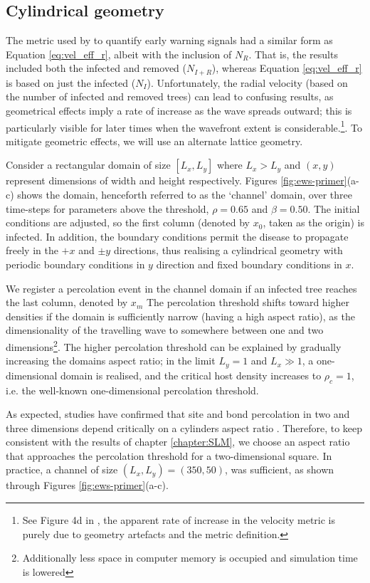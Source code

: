 \subsection{Cylindrical geometry}

The metric used by \cite{OROZCOFUENTES201912} to quantify early warning signals had a similar form as Equation \ref{eq:vel_eff_r}, albeit with the inclusion of $N_R$.
That is, the results included both the infected and removed ($N_{I+R}$), whereas Equation \ref{eq:vel_eff_r} is based on just the infected ($N_I$). 
Unfortunately, the radial velocity (based on the number of infected and removed trees) can lead to confusing results, as geometrical effects imply a rate of increase as the wave spreads outward; this is particularly visible for later times when the wavefront extent is considerable.\footnote{See Figure 4d in \cite{OROZCOFUENTES201912}, the apparent rate of increase in the velocity metric is purely due to geometry artefacts and the metric definition.}.
To mitigate geometric effects, we will use an alternate lattice geometry.

Consider a rectangular domain of size $[L_x, L_y]$ where $L_x>L_y$ and $(x, y)$ represent dimensions of width and height respectively.
Figures \ref{fig:ews-primer}(a-c) shows the domain, henceforth referred to as the `channel' domain, over three time-steps for parameters above the threshold, $\rho=0.65$ and $\beta=0.50$.
The initial conditions are adjusted, so the first column (denoted by $x_0$, taken as the origin) is infected.
In addition, the boundary conditions permit the disease to propagate freely in the $+x$ and $\pm y$ directions, thus realising a cylindrical geometry with periodic boundary conditions in $y$ direction and fixed boundary conditions in $x$.

We register a percolation event in the channel domain if an infected tree reaches the last column, denoted by $x_m$
The percolation threshold shifts toward higher densities if the domain is sufficiently narrow (having a high aspect ratio), as the dimensionality of the travelling wave to somewhere between one and two dimensions\footnote{Additionally less space in computer memory is occupied and simulation time is lowered}. 
The higher percolation threshold can be explained by gradually increasing the domains aspect ratio;
in the limit $L_y = 1$ and $L_x  \gg 1$, a one-dimensional domain is realised, and the critical host density increases to $\rho_c=1$, i.e. the well-known one-dimensional percolation threshold.

As expected, studies have confirmed that site and bond percolation in two and three dimensions depend critically on a cylinders aspect ratio \cite{sangare2009continuum, munson1991estimation}.
Therefore, to keep consistent with the results of chapter \ref{chapter:SLM}, we choose an aspect ratio that approaches the percolation threshold for a two-dimensional square. In practice, a channel of size $(L_x, L_y) = (350, 50)$, was sufficient, as shown through Figures \ref{fig:ews-primer}(a-c). 

